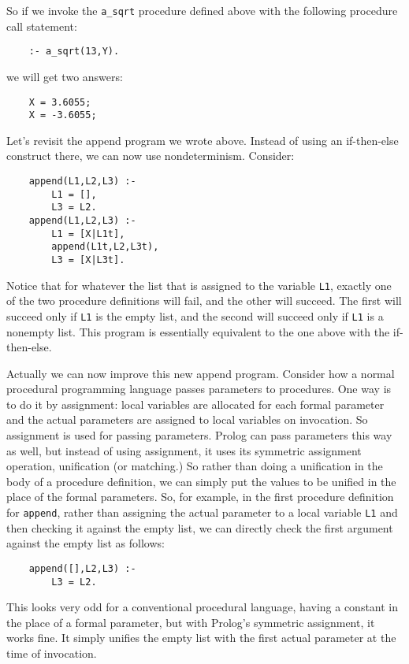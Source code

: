 So if we invoke the \verb|a_sqrt| procedure defined above with the
following procedure call statement:
\begin{verbatim}
    :- a_sqrt(13,Y).
\end{verbatim}
we will get two answers:
\begin{verbatim}
    X = 3.6055;
    X = -3.6055;
\end{verbatim}

Let's revisit the append program we wrote above.  Instead of using an
if-then-else construct there, we can now use nondeterminism.
Consider:
\begin{verbatim}
    append(L1,L2,L3) :-
        L1 = [],
        L3 = L2.
    append(L1,L2,L3) :-
        L1 = [X|L1t],
        append(L1t,L2,L3t),
        L3 = [X|L3t].
\end{verbatim}
Notice that for whatever the list that is assigned to the variable
\verb|L1|, exactly one of the two procedure definitions will fail, and
the other will succeed.  The first will succeed only if \verb|L1| is
the empty list, and the second will succeed only if \verb|L1| is a
nonempty list.  This program is essentially equivalent to the one
above with the if-then-else.

Actually we can now improve this new append program.  Consider how a
normal procedural programming language passes parameters to
procedures.  One way is to do it by assignment: local variables are
allocated for each formal parameter and the actual parameters are
assigned to local variables on invocation.  So assignment is used for
passing parameters.  Prolog can pass parameters this way as well, but
instead of using assignment, it uses its symmetric assignment
operation, unification (or matching.)  So rather than doing a
unification in the body of a procedure definition, we can simply put
the values to be unified in the place of the formal parameters.  So,
for example, in the first procedure definition for \verb|append|,
rather than assigning the actual parameter to a local variable
\verb|L1| and then checking it against the empty list, we can directly
check the first argument against the empty list as follows:
\begin{verbatim}
    append([],L2,L3) :-
        L3 = L2.
\end{verbatim}
This looks very odd for a conventional procedural language, having a
constant in the place of a formal parameter, but with Prolog's
symmetric assignment, it works fine.  It simply unifies the empty list
with the first actual parameter at the time of invocation.

